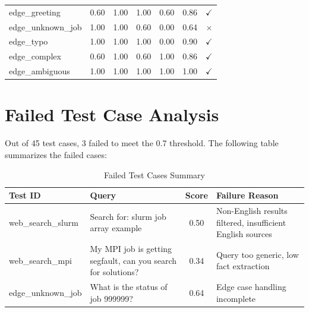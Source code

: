 {\begin{longtable}{|p{4cm}|c|c|c|c|c|c|}
edge\_greeting & 0.60 & 1.00 & 1.00 & 0.60 & 0.86 & $\checkmark$ \\
edge\_unknown\_job & 1.00 & 1.00 & 0.60 & 0.00 & 0.64 & $\times$ \\
edge\_typo & 1.00 & 1.00 & 1.00 & 0.00 & 0.90 & $\checkmark$ \\
edge\_complex & 0.60 & 1.00 & 0.60 & 1.00 & 0.86 & $\checkmark$ \\
edge\_ambiguous & 1.00 & 1.00 & 1.00 & 1.00 & 1.00 & $\checkmark$ \\

\end{longtable}
}

\section{Failed Test Case Analysis}

Out of 45 test cases, 3 failed to meet the 0.7 threshold. The following table summarizes the failed cases:

\begin{table}[H]
\centering
\caption{Failed Test Cases Summary}
\label{tab:failed-tests}
\small
\begin{tabular}{|p{3.5cm}|p{5cm}|c|p{5cm}|}
\hline
\textbf{Test ID} & \textbf{Query} & \textbf{Score} & \textbf{Failure Reason} \\
\hline
web\_search\_slurm & Search for: slurm job array example & 0.50 & Non-English results filtered, insufficient English sources \\
web\_search\_mpi & My MPI job is getting segfault, can you search for solutions? & 0.34 & Query too generic, low fact extraction \\
edge\_unknown\_job & What is the status of job 999999? & 0.64 & Edge case handling incomplete \\
\hline
\end{tabular}
\end{table}
